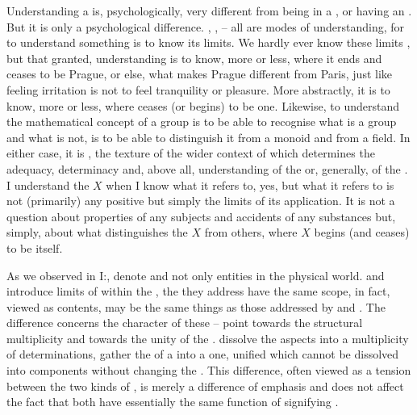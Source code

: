 \pa Understanding a  is, psychologically, very different from
being in a , or having an .  But it is only a
psychological difference. , ,  -- all are
modes of understanding, for to 
understand something is to know its limits.  We hardly ever know these limits
, but that granted, understanding  is to know, more or
less, where it ends and ceases to be Prague, or else, what makes Prague
different from Paris, just like feeling {irritation} is not to feel tranquility or
pleasure. More abstractly, it is to know, more or less, where  
ceases (or begins) to be one. Likewise, to understand the mathematical concept
of a group is to be able to recognise what is a group and what is not, is
to be able to distinguish it from a monoid and from a field. In either case, it
is , the texture of the wider context of 
 which determines the adequacy, determinacy and, above all,
understanding of the  or, generally, of the . I understand the 
 $X$ when I know what  
it refers to, yes, but what it refers to is not (primarily) any positive
 but simply the limits of its application.  It is not a question
about properties of any subjects and accidents of any substances but, simply,
about what distinguishes the  $X$ from others, where $X$ begins (and
ceases) to be itself. 


As we observed in I:,  denote 
and not only  entities in the physical world.   and
 introduce limits of  within the \hoa, the
 they address have the same scope, in fact, viewed as
 contents, may be the same things as those addressed by
 and .  The difference concerns the character of these
 --  point towards the structural multiplicity and
 towards the unity of the .  dissolve the
 aspects into a multiplicity of  determinations,
 gather the  of a  into a one, unified
 which cannot be dissolved into components without changing the
.  This difference, often viewed as a tension between the two
kinds of , is merely a difference of emphasis and does not affect the
fact that both have essentially the same function of signifying .


